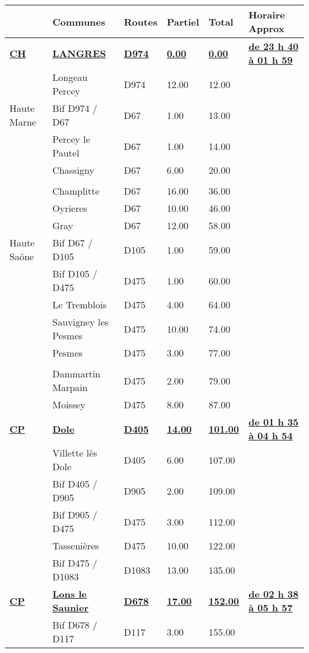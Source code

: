 \documentclass{article}%
\begin{document}
\begin{longtable}{p{2.25cm}|p{6.7cm}|p{2.0cm}|p{1.5cm}|p{1.5cm}|p{3.5cm}}%
\hline%
&Communes&Routes&Partiel&Total&Horaire Approx\\%
\hline%
\endhead%
\endfoot%
\endlastfoot%
\textbf{\underline{﻿CH}}&\textbf{\underline{LANGRES }}&\textbf{\underline{D974}}&\textbf{\underline{0.00}}&\textbf{\underline{0.00}}&\textbf{\underline{de 23 h 40 à 01 h 59}}\\%
 &Longeau  Percey&D974&12.00&12.00& \\%
Haute Marne&Bif D974 / D67&D67&1.00&13.00& \\%
 &Percey le Pautel&D67&1.00&14.00& \\%
 &Chassigny&D67&6.00&20.00& \\%
\hline& & & & & \\%
 &Champlitte&D67&16.00&36.00& \\%
 &Oyrieres&D67&10.00&46.00& \\%
 &Gray &D67&12.00&58.00& \\%
Haute Saône&Bif D67 / D105&D105&1.00&59.00& \\%
 &Bif D105 / D475&D475&1.00&60.00& \\%
 &Le Tremblois&D475&4.00&64.00& \\%
 &Sauvigney les Pesmes&D475&10.00&74.00& \\%
 &Pesmes&D475&3.00&77.00& \\%
\hline& & & & & \\%
 &Dammartin Marpain&D475&2.00&79.00& \\%
 &Moissey &D475&8.00&87.00& \\%
\textbf{\underline{CP}}&\textbf{\underline{Dole }}&\textbf{\underline{D405}}&\textbf{\underline{14.00}}&\textbf{\underline{101.00}}&\textbf{\underline{de 01 h 35 à 04 h 54}}\\%
 &Villette lès Dole&D405&6.00&107.00& \\%
 &Bif D405 / D905 &D905 &2.00&109.00& \\%
 &Bif D905 / D475 &D475&3.00&112.00& \\%
 &Tassenières&D475&10.00&122.00& \\%
 &Bif D475 / D1083&D1083&13.00&135.00& \\%
\textbf{\underline{CP}}&\textbf{\underline{Lons le Saunier}}&\textbf{\underline{D678}}&\textbf{\underline{17.00}}&\textbf{\underline{152.00}}&\textbf{\underline{de 02 h 38 à 05 h 57}}\\%
 &Bif D678 / D117&D117&3.00&155.00& \\%

\end{longtable}
\end{document}
